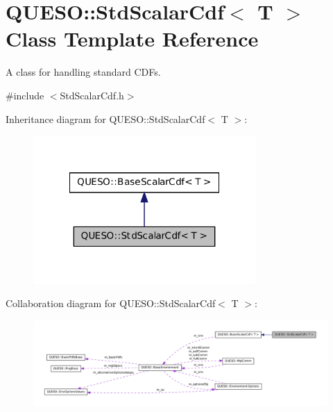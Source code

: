 \hypertarget{class_q_u_e_s_o_1_1_std_scalar_cdf}{\section{Q\-U\-E\-S\-O\-:\-:Std\-Scalar\-Cdf$<$ T $>$ Class Template Reference}
\label{class_q_u_e_s_o_1_1_std_scalar_cdf}
}


A class for handling standard C\-D\-Fs.  




{\ttfamily \#include $<$Std\-Scalar\-Cdf.\-h$>$}



Inheritance diagram for Q\-U\-E\-S\-O\-:\-:Std\-Scalar\-Cdf$<$ T $>$\-:
\nopagebreak
\begin{figure}[H]
\begin{center}
\leavevmode
\includegraphics[width=240pt]{class_q_u_e_s_o_1_1_std_scalar_cdf__inherit__graph}
\end{center}
\end{figure}


Collaboration diagram for Q\-U\-E\-S\-O\-:\-:Std\-Scalar\-Cdf$<$ T $>$\-:
\nopagebreak
\begin{figure}[H]
\begin{center}
\leavevmode
\includegraphics[width=350pt]{class_q_u_e_s_o_1_1_std_scalar_cdf__coll__graph}
\end{center}
\end{figure}
